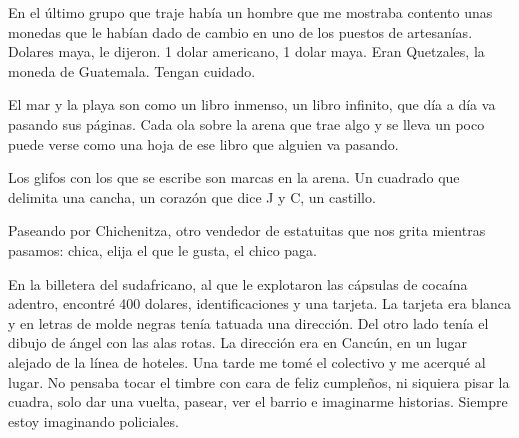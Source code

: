 \documentclass[12pt,twoside,openright,a5paper]{book}
\begin{document}
\vspace{0.5cm}
\hrulefill\hspace{0.2cm} \decofourleft\decofourright \hspace{0.2cm} \hrulefill
\vspace{0.5cm}

En el último grupo que traje había un hombre que me mostraba contento
unas monedas que le habían dado de cambio en uno de los puestos de
artesanías. Dolares maya, le dijeron. 1 dolar americano, 1 dolar maya. Eran
Quetzales, la moneda de Guatemala. Tengan cuidado.


\vspace{0.5cm}
\hrulefill\hspace{0.2cm} \decofourleft\decofourright \hspace{0.2cm} \hrulefill
\vspace{0.5cm}

El mar y la playa son como un libro inmenso, un libro infinito, que día
a día va pasando sus páginas. Cada ola sobre la arena que trae algo y se
lleva un poco puede verse como una hoja de ese libro que alguien va pasando.

Los glifos con los que se escribe son marcas en la arena. Un cuadrado que
delimita una cancha, un corazón que dice J y C, un castillo.


\vspace{0.5cm}
\hrulefill\hspace{0.2cm} \decofourleft\decofourright \hspace{0.2cm} \hrulefill
\vspace{0.5cm}

Paseando por Chichenitza, otro vendedor de estatuitas que nos grita mientras
pasamos: chica, elija el que le gusta, el chico paga.


\vspace{0.5cm}
\hrulefill\hspace{0.2cm} \decofourleft\decofourright \hspace{0.2cm} \hrulefill
\vspace{0.5cm}

En la billetera del sudafricano, al que le explotaron las cápsulas
de cocaína adentro, encontré 400 dolares, identificaciones y una
tarjeta. La tarjeta era blanca y en letras de molde negras tenía tatuada
una dirección. Del otro lado tenía el dibujo de ángel con las alas
rotas. La dirección era en Cancún, en un lugar alejado de la línea de
hoteles. Una tarde me tomé el colectivo y me acerqué al lugar. No pensaba
tocar el timbre con cara de feliz cumpleños, ni siquiera pisar la cuadra,
solo dar una vuelta, pasear, ver el barrio e imaginarme historias. Siempre
estoy imaginando policiales.
\end{document}

